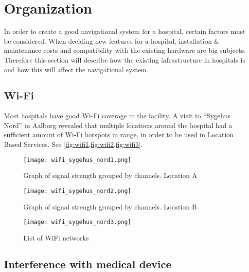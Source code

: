 \section{Organization} %
\label{sec:organization}



In order to create a good navigational system for a hospital, certain factors must be considered. When deciding new features for a hospital, installation \& maintenance costs and compatibility with the existing hardware are big subjects. Therefore this section will describe how the existing infrastructure in hospitals is and how this will affect the navigational system.

\subsection{Wi-Fi} \label{orgwifi}

Most hospitals have good Wi-Fi coverage in the facility. A visit to \enquote{Sygehus Nord} in Aalborg revealed that multiple locations around the hospital had a sufficient amount of Wi-Fi hotspots in range, in order to be used in Location Based Services. See \cref{fig:wifi1,fig:wifi2,fig:wifi3}.

\begin{figure}
\centering
  \begin{minipage}{0.45\textwidth}
    \centering
    \texttt{[image: wifi\_sygehus\_nord1.png]}
    \caption{Graph of signal strength grouped by channels. Location A} \label{fig:wifi1}
  \end{minipage}
  \hfill
  \begin{minipage}{0.45\textwidth}
    \centering
    \texttt{[image: wifi\_sygehus\_nord2.png]}
    \caption{Graph of signal strength grouped by channels. Location B} \label{fig:wifi2}
  \end{minipage}
    \begin{minipage}{0.45\textwidth}
    \centering
    \texttt{[image: wifi\_sygehus\_nord3.png]}
    \caption{List of WiFi networks} \label{fig:wifi3}
  \end{minipage}
  \end{figure}


\subsection{Interference with medical device}

